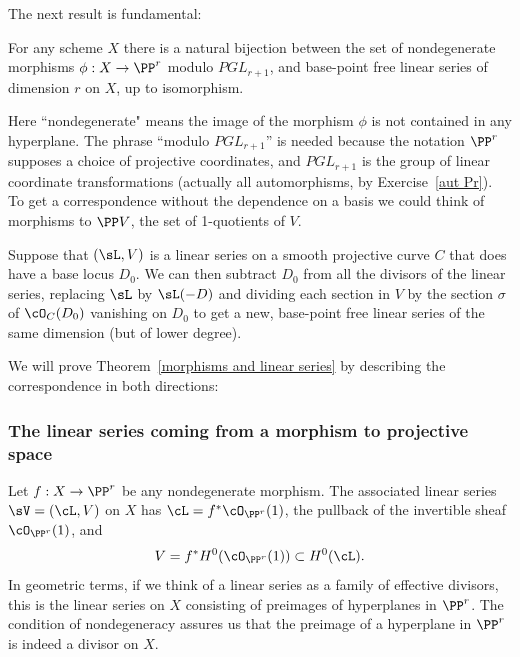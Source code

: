 The next result is fundamental:

\begin{theorem}\label{morphisms and linear series}
For any scheme $X$ there is a natural bijection between the set of nondegenerate morphisms $\phi : X \to \PP^r$ modulo $PGL_{r+1}$, and base-point free linear series of dimension $r$ on $X$, up to isomorphism.
\end{theorem}


Here ``nondegenerate" means the image of the morphism $\phi$ is not contained in any hyperplane. The phrase ``modulo $PGL_{r+1}$'' is needed because the notation $\PP^r$ supposes a choice of projective coordinates, and
$PGL_{r+1}$ is the group of linear coordinate transformations (actually all automorphisms, by Exercise~\ref{aut Pr}).
To get a correspondence without the dependence on a basis we could think of morphisms to $\PP V$, the set of 1-quotients of $V$.

Suppose that $(\sL, V)$ is a linear series on a smooth projective curve $C$ that does have a base locus $D_0$. We can then subtract $D_0$ from all the divisors of the linear series, replacing $\sL$ by $\sL(-D)$ and dividing each section in $V$
by the section $\sigma$ of $\cO_C(D_0)$ vanishing on $D_0$ to get a new, base-point free linear series of the same dimension (but of lower degree). 

We will prove Theorem~\ref{morphisms and linear series} by describing the correspondence in both directions:

\subsubsection{The linear series coming from a morphism to projective space}\label{series from morphism}

Let $f : X \to \PP^r$ be any nondegenerate morphism. The associated linear series $\sV = (\cL, V)$ on $X$ has $\cL = f^*\cO_{\PP^r}(1)$, the pullback of the invertible sheaf $\cO_{\PP^r}(1)$, and 
$$
V = f^*H^0(\cO_{\PP^r}(1)) \subset H^0(\cL).
$$
In geometric terms, if we think of a linear series as a family of effective divisors, this is the linear series on $X$ consisting of preimages of hyperplanes in $\PP^r$. The condition of nondegeneracy assures us that the preimage of a hyperplane in $\PP^r$ is indeed a divisor on $X$.

